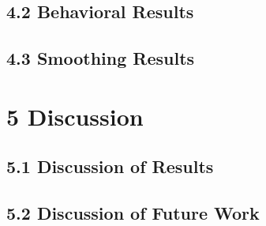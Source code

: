 \documentclass[11pt]{article}
\begin{document}
    \subsection{4.2 Behavioral Results}
                
    \subsection{4.3 Smoothing Results}
                

\section{5 Discussion}

    \subsection{5.1 Discussion of Results}
            
    \subsection{5.2 Discussion of Future Work}
            


\end{document}
